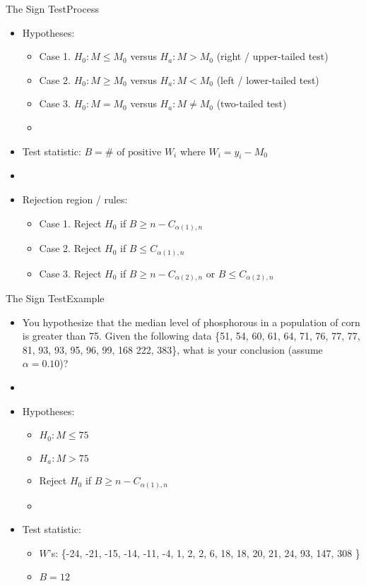 \documentclass[xcolor=dvipsnames]{beamer}
\begin{document}
\begin{frame}{The Sign Test}{Process}
\begin{itemize}
\item Hypotheses:
\begin{itemize}
	\item Case 1. $H_0: M \leq M_0$ versus $H_a: M > M_0$ (right / upper-tailed test)
	\item Case 2. $H_0: M \geq M_0$ versus $H_a: M < M_0$ (left / lower-tailed test)
	\item Case 3. $H_0: M = M_0$ versus $H_a: M \neq M_0$ (two-tailed test)
	\item[]
\end{itemize}
\item Test statistic: $B = \# \text{ of positive } W_i$ where $W_i = y_i - M_0$
\item[]
\item Rejection region / rules: 
\begin{itemize}
	\item Case 1. Reject $H_0$ if $B \geq n - C_{\alpha(1), n}$
	\item Case 2. Reject $H_0$ if $B \leq C_{\alpha(1), n}$
	\item Case 3. Reject $H_0$ if $B \geq n - C_{\alpha(2), n}$ or $B \leq C_{\alpha(2), n}$
\end{itemize}
\end{itemize}
\end{frame}

\begin{frame}{The Sign Test}{Example}
	\begin{itemize}
		\item You hypothesize that the median level of phosphorous in a population of corn is greater than 75. Given the following data \{51, 54, 60, 61, 64, 71, 76, 77, 77, 81, 93, 93, 95, 96, 99, 168 222, 383\}, what is your conclusion (assume $\alpha = 0.10$)?
		\item[]
		\item Hypotheses:
		\begin{itemize}
			\item $H_0: M \leq 75$
			\item $H_a: M > 75$
			\item Reject $H_0$ if $B \geq n - C_{\alpha(1), n}$
			\item[]
		\end{itemize}
	\item Test statistic:
	\begin{itemize}
		\item $W$'s: \{-24, -21, -15, -14, -11,  -4, 1, 2, 2, 6, 18, 18, 20, 21, 24, 93, 147, 308 \}
		\item $B = 12$
	\end{itemize}
	\end{itemize}
\end{frame}
\end{document}
